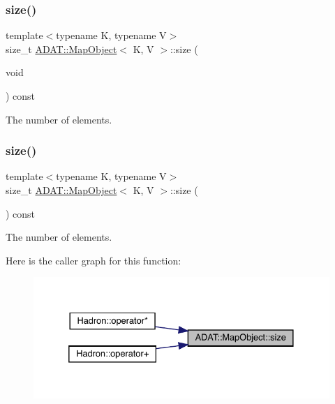 \subsubsection{\texorpdfstring{size()}{size()}\hspace{0.1cm}{\footnotesize\ttfamily [1/2]}}
{\footnotesize\ttfamily template$<$typename K, typename V$>$ \\
size\+\_\+t \mbox{\hyperlink{classADAT_1_1MapObject}{A\+D\+A\+T\+::\+Map\+Object}}$<$ K, V $>$\+::size (\begin{DoxyParamCaption}\item[{void}]{ }\end{DoxyParamCaption}) const\hspace{0.3cm}{\ttfamily [inline]}}



The number of elements. 

\mbox{\label{classADAT_1_1MapObject_ac0f5c3b258d234a7baf4f3d75e304af7}} 
\subsubsection{\texorpdfstring{size()}{size()}\hspace{0.1cm}{\footnotesize\ttfamily [2/2]}}
{\footnotesize\ttfamily template$<$typename K, typename V$>$ \\
size\+\_\+t \mbox{\hyperlink{classADAT_1_1MapObject}{A\+D\+A\+T\+::\+Map\+Object}}$<$ K, V $>$\+::size (\begin{DoxyParamCaption}{ }\end{DoxyParamCaption}) const\hspace{0.3cm}{\ttfamily [inline]}}



The number of elements. 

Here is the caller graph for this function\+:\nopagebreak
\begin{figure}[H]
\begin{center}
\leavevmode
\includegraphics[width=332pt]{da/d29/classADAT_1_1MapObject_ac0f5c3b258d234a7baf4f3d75e304af7_icgraph}
\end{center}
\end{figure}


